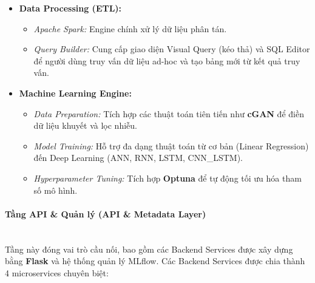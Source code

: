 \begin{itemize}
    \item \textbf{Data Processing (ETL):}
    \begin{itemize}
        \item \textit{Apache Spark:} Engine chính xử lý dữ liệu phân tán.
        \item \textit{Query Builder:} Cung cấp giao diện Visual Query (kéo thả) và SQL Editor để người dùng truy vấn dữ liệu ad-hoc và tạo bảng mới từ kết quả truy vấn.
    \end{itemize}
    \item \textbf{Machine Learning Engine:}
    \begin{itemize}
        \item \textit{Data Preparation:} Tích hợp các thuật toán tiên tiến như \textbf{cGAN} để điền dữ liệu khuyết và lọc nhiễu.
        \item \textit{Model Training:} Hỗ trợ đa dạng thuật toán từ cơ bản (Linear Regression) đến Deep Learning (ANN, RNN, LSTM, CNN\_LSTM).
        \item \textit{Hyperparameter Tuning:} Tích hợp \textbf{Optuna} để tự động tối ưu hóa tham số mô hình.
    \end{itemize}
\end{itemize}

\paragraph{Tầng API \& Quản lý (API \& Metadata Layer)}
\mbox{}\\
Tầng này đóng vai trò cầu nối, bao gồm các Backend Services được xây dựng bằng \textbf{Flask} và hệ thống quản lý MLflow. Các Backend Services được chia thành 4 microservices chuyên biệt:

